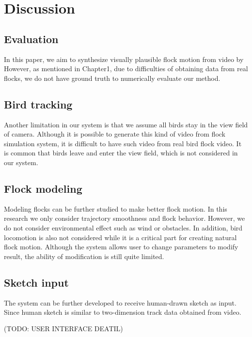 \chapter{Discussion}


\section{Evaluation}


In this paper, we aim to synthesize visually plausible flock motion from video by However, as mentioned in Chapter1, due to difficulties of obtaining data from real flocks, we do not have ground truth to numerically evaluate our method.


\section{Bird tracking}


Another limitation in our system is that we assume all birds stay in the view field of camera. Although it is possible to generate this kind of video from flock simulation system, it is difficult to have such video from real bird flock video. It is common that birds leave and enter the view field, which is not considered in our system. 


\section{Flock modeling}


Modeling flocks can be further studied to make better flock motion. In this research we only consider trajectory smoothness and flock behavior. However, we do not consider environmental effect such as wind or obstacles. In addition, bird locomotion is also not considered while it is a critical part for creating natural flock motion. 
Although the system allows user to change parameters to modify result, the ability of modification is still quite limited. 


\section{Sketch input}


The system can be further developed to receive human-drawn sketch as input. Since human sketch is similar to two-dimension track data obtained from video.


(TODO: USER INTERFACE DEATIL)
